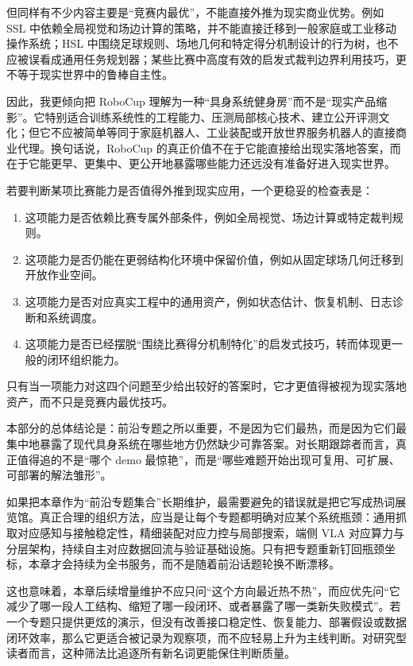 但同样有不少内容主要是“竞赛内最优”，不能直接外推为现实商业优势。例如 SSL 中依赖全局视觉和场边计算的策略，并不能直接迁移到一般家庭或工业移动操作系统；HSL 中围绕足球规则、场地几何和特定得分机制设计的行为树，也不应被误看成通用任务规划器；某些比赛中高度有效的启发式裁判边界利用技巧，更不等于现实世界中的鲁棒自主性。

因此，我更倾向把 RoboCup 理解为一种“具身系统健身房”而不是“现实产品缩影”。它特别适合训练系统性的工程能力、压测局部核心技术、建立公开评测文化；但它不应被简单等同于家庭机器人、工业装配或开放世界服务机器人的直接商业代理。换句话说，RoboCup 的真正价值不在于它能直接给出现实落地答案，而在于它能更早、更集中、更公开地暴露哪些能力还远没有准备好进入现实世界。

若要判断某项比赛能力是否值得外推到现实应用，一个更稳妥的检查表是：

\begin{enumerate}
\item 这项能力是否依赖比赛专属外部条件，例如全局视觉、场边计算或特定裁判规则。
\item 这项能力是否仍能在更弱结构化环境中保留价值，例如从固定球场几何迁移到开放作业空间。
\item 这项能力是否对应真实工程中的通用资产，例如状态估计、恢复机制、日志诊断和系统调度。
\item 这项能力是否已经摆脱“围绕比赛得分机制特化”的启发式技巧，转而体现更一般的闭环组织能力。
\end{enumerate}

只有当一项能力对这四个问题至少给出较好的答案时，它才更值得被视为现实落地资产，而不只是竞赛内最优技巧。

本部分的总体结论是：前沿专题之所以重要，不是因为它们最热，而是因为它们最集中地暴露了现代具身系统在哪些地方仍然缺少可靠答案。对长期跟踪者而言，真正值得追的不是“哪个 demo 最惊艳”，而是“哪些难题开始出现可复用、可扩展、可部署的解法雏形”。

如果把本章作为“前沿专题集合”长期维护，最需要避免的错误就是把它写成热词展览馆。真正合理的组织方法，应当是让每个专题都明确对应某个系统瓶颈：通用抓取对应感知与接触稳定性，精细装配对应力控与局部搜索，端侧 VLA 对应算力与分层架构，持续自主对应数据回流与验证基础设施。只有把专题重新钉回瓶颈坐标，本章才会持续为全书服务，而不是随着前沿话题轮换不断漂移。

这也意味着，本章后续增量维护不应只问“这个方向最近热不热”，而应优先问“它减少了哪一段人工结构、缩短了哪一段闭环、或者暴露了哪一类新失败模式”。若一个专题只提供更炫的演示，但没有改善接口稳定性、恢复能力、部署假设或数据闭环效率，那么它更适合被记录为观察项，而不应轻易上升为主线判断。对研究型读者而言，这种筛法比追逐所有新名词更能保住判断质量。

